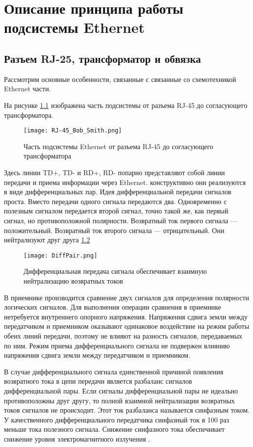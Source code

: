 \chapter{Описание принципа работы подсистемы Ethernet}
\section{Разъем RJ-25, трансформатор и обвязка}
\hspace{1cm} 

Рассмотрим основные особенности, связанные с связанные со схемотехникой Ethernet части. 

На рисунке \ref{ris:RJ-45} изображена часть подсистемы от разъема RJ-45 до согласующего трансформатора. 

\begin{figure}[H]
\centering
\texttt{[image: RJ-45\_Bob\_Smith.png]}
\caption{Часть подсистемы Ethernet от разъема RJ-45 до согласующего трансформатора}
\label{ris:RJ-45}
\end{figure}

Здесь линии TD+, TD- и RD+, RD- попарно представляют собой линии передачи и приема информации через Ethernet. 
конструктивно они реализуются в виде дифференциальных пар. 
Идея дифференциальной передачи сигналов проста. Вместо передачи одного
сигнала передаются два. Одновременно с полезным сигналом передается второй
сигнал, точно такой же, как первый сигнал, но противоположной полярности.
Возвратный ток первого сигнала — положительный. Возвратный ток второго сигнала — 
отрицательный. Они нейтрализуют друг друга \ref{ris:DiffPair}

\begin{figure}[H]
\centering
\texttt{[image: DiffPair.png]}
\caption{Дифференциальная передача сигнала обеспечивает взаимную нейтрализацию
возвратных токов}
\label{ris:DiffPair}
\end{figure}

В приемнике производится сравнение двух сигналов для определения полярности логических сигналов. Для 
выполнения операции сравнения в приемнике нетребуется внутреннего опорного напряжения. Напряжения сдвига земли
между передатчиком и приемником оказывают одинаковое воздействие на режим работы
обеих линий передачи, поэтому не влияют на разность сигналов, передаваемых по ним. 
Режим приема дифференциального сигнала не подвержен влиянию напряжения сдвига земли между передатчиком и 
приемником.

В случае дифференциального сигнала единственной причиной появления возвратного тока в цепи передачи является 
разбаланс сигналов дифференциальной пары. Если сигналы дифференциальной пары не идеально противоположны друг
другу, то полной взаимной нейтрализации возвратных токов сигналов не происходит. Этот ток разбаланса называется 
синфазным током. У качественного дифференциального передатчика синфазный ток в 100 раз меньше тока полезного
сигнала. Снижение синфазного тока обеспечивает снижение уровня электромагнитного излучения 
\cite{Howard J: Start Black Magic}.

